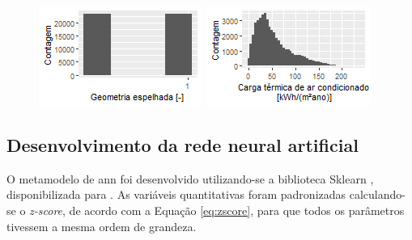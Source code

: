 \documentclass{article}
\begin{document}
\begin{figure}[h!]
\begin{minipage}{.33\textwidth}
	\end{minipage}
	\begin{minipage}{.33\textwidth}
		\includegraphics[width=\linewidth]{plot_mirror.png}
	\end{minipage}
	\begin{minipage}{.33\textwidth}
		\includegraphics[width=\linewidth]{plot_cgtt.png}
	\end{minipage}
\end{figure}

\subsection{Desenvolvimento da rede neural artificial}

O metamodelo de \acrshort{ann} foi desenvolvido utilizando-se a biblioteca Sklearn \citep{scikit-learn}, disponibilizada para \citet{Python}.
As variáveis quantitativas foram padronizadas calculando-se o \textit{z-score}, de acordo com a Equação \ref{eq:zscore}, para que todos os parâmetros tivessem a mesma ordem de grandeza.
\end{document}

